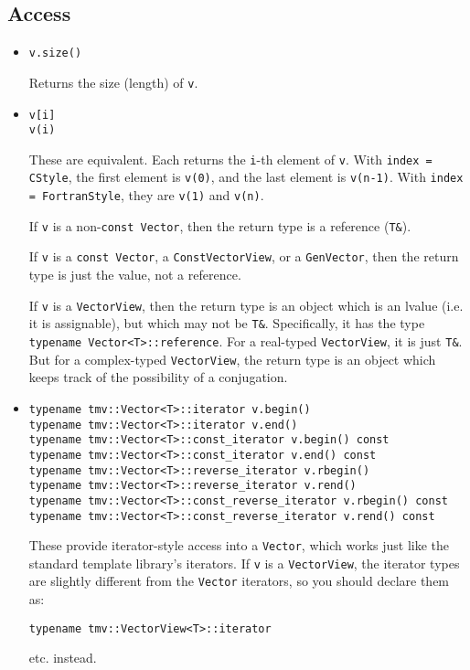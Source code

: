 \documentclass[twoside,letterpaper,11pt]{article}
\renewcommand{\tt}[1]{{\texttt {#1}}}
\begin{document}
\subsection{Access}

\begin{itemize}
\item
\begin{verbatim}
v.size()
\end{verbatim}
Returns the size (length) of \tt{v}.

\item
\begin{verbatim}
v[i]
v(i)
\end{verbatim}
These are equivalent.  Each returns the \tt{i}-th element of \tt{v}.  
With \tt{index = CStyle}, the first 
element is \tt{v(0)}, and the last element is \tt{v(n-1)}.
With \tt{index = FortranStyle}, they are \tt{v(1)} and \tt{v(n)}.

If \tt{v} is a 
non-\tt{const Vector}, then the return type is a reference (\tt{T\&}).

If \tt{v} is a 
\tt{const Vector}, a \tt{ConstVectorView}, or a \tt{GenVector}, 
then the return type is just the value, not a reference.

If \tt{v} is a \tt{VectorView}, then the return type is an object which is
an lvalue (i.e. it is assignable), but which may not be \tt{T\&}.
Specifically, it has the type \tt{typename Vector<T>::reference}.
For a real-typed \tt{VectorView}, it is just \tt{T\&}.  But for a
complex-typed \tt{VectorView}, the return type is an object which keeps track of the
possibility of a conjugation.

\item
\begin{verbatim}
typename tmv::Vector<T>::iterator v.begin()
typename tmv::Vector<T>::iterator v.end()
typename tmv::Vector<T>::const_iterator v.begin() const
typename tmv::Vector<T>::const_iterator v.end() const
typename tmv::Vector<T>::reverse_iterator v.rbegin()
typename tmv::Vector<T>::reverse_iterator v.rend()
typename tmv::Vector<T>::const_reverse_iterator v.rbegin() const
typename tmv::Vector<T>::const_reverse_iterator v.rend() const
\end{verbatim}
These provide iterator-style access into a \tt{Vector}, which works just like
the standard template library's iterators.  If \tt{v} is a \tt{VectorView},
the iterator types are slightly different from the \tt{Vector} iterators, 
so you should declare them as:
\begin{verbatim}
typename tmv::VectorView<T>::iterator
\end{verbatim}
etc. instead.

\end{itemize}
\end{document}
